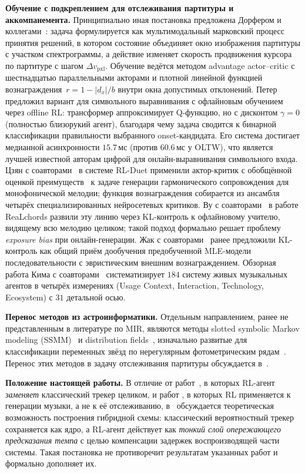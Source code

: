 \textbf{Обучение с подкреплением для отслеживания партитуры и
аккомпанемента.} Принципиально иная постановка предложена
Дорфером и коллегами~\cite{Dorfer2018RL}: задача формулируется
как мультимодальный марковский процесс принятия решений, в
котором состояние объединяет окно изображения партитуры с
участком спектрограммы, а действие изменяет скорость продвижения
курсора по партитуре с шагом $\Delta v_{\text{pxl}}$. Обучение
ведётся методом advantage actor--critic с шестнадцатью
параллельными акторами и плотной линейной функцией
вознаграждения~$r=1-|d_x|/b$ внутри окна допустимых отклонений.
Петер~\cite{Peter2023} предложил вариант для символьного
выравнивания с офлайновым обучением через offline RL: трансформер
аппроксимирует Q-функцию, но с дисконтом $\gamma=0$ (полностью
близорукий агент), благодаря чему задача сводится к бинарной
классификации правильности выбранного onset-кандидата. Его
система достигает медианной асинхронности $15.7$\,мс
(против $60.6$\,мс у OLTW), что является лучшей известной
авторам цифрой для онлайн-выравнивания символьного входа.
Цзян с соавторами~\cite{Jiang2020RLDuet} в системе RL-Duet
применили актор-критик с обобщённой оценкой
преимуществ~\cite{Schulman2016GAE} к задаче генерации
гармонического сопровождения для монофонической мелодии; функция
вознаграждения собирается из ансамбля
четырёх специализированных нейросетевых критиков. Ву с
соавторами~\cite{Wu2024ReaLchords} в работе ReaLchords развили
эту линию через KL-контроль к офлайновому учителю, видящему всю
мелодию целиком; такой подход формально решает проблему
\textit{exposure bias} при онлайн-генерации. Жак с
соавторами~\cite{Jaques2017SeqTutor} ранее предложили
KL-контроль как общий приём дообучения предобученной MLE-модели
последовательности с эвристическим внешним вознаграждением.
Обзорная работа Кима с соавторами~\cite{Kim2026LiveAgents}
систематизирует $184$ систему живых музыкальных агентов в
четырёх измерениях (Usage Context, Interaction, Technology,
Ecosystem) с $31$ детальной осью.

\textbf{Перенос методов из астроинформатики.} Отдельным
направлением, ранее не представленным в литературе по MIR,
являются методы slotted symbolic Markov modeling
(SSMM)~\cite{JohnstonPeter2017} и distribution
fields~\cite{SevillaLaraDF2012}, изначально развитые для
классификации переменных звёзд по нерегулярным фотометрическим
рядам~\cite{Johnston2020}. Перенос этих методов в задачу
отслеживания партитуры обсуждается в~.

\textbf{Положение настоящей работы.} В отличие от
работ~\cite{Dorfer2018RL,Peter2023}, в которых RL-агент
\textit{заменяет} классический трекер целиком, и работ
\cite{Jiang2020RLDuet,Wu2024ReaLchords}, в которых RL применяется
к генерации музыки, а не к её отслеживанию, в~
обсуждается теоретическая возможность построения гибридной
схемы: классический вероятностный трекер сохраняется как ядро,
а RL-агент действует как \textit{тонкий слой опережающего
предсказания темпа} с целью компенсации задержек воспроизводящей
части системы. Такая постановка не противоречит результатам
указанных работ и формально дополняет их.
